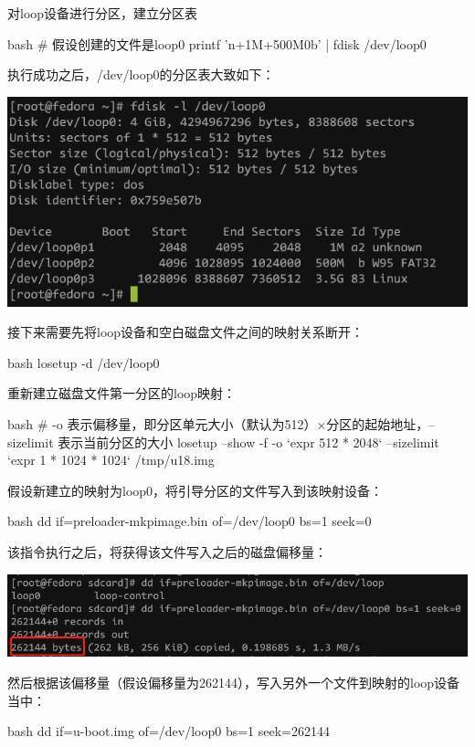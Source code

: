 \begin{outline}[enumerate]
对loop设备进行分区，建立分区表
\begin{code-block}{bash}
# 假设创建的文件是loop0
printf 'n\np{}\n\n+1M\nt{}\nn\np{}\n\n+500M\nt\n\n0b\nn\np\n\n\n\n\nwq\n' | fdisk /dev/loop0
\end{code-block}
执行成功之后，/dev/loop0的分区表大致如下：
\par\begin{minipage}{\linewidth}
  \centering
  \includegraphics[width=\linewidth]{loop_partition.png}
  \label{fig:loop_partition}
\end{minipage}

接下来需要先将loop设备和空白磁盘文件之间的映射关系断开：
\begin{code-block}{bash}
losetup -d /dev/loop0
\end{code-block}

重新建立磁盘文件第一分区的loop映射：
\begin{code-block}{bash}
# -o 表示偏移量，即分区单元大小（默认为512）×分区的起始地址，--sizelimit 表示当前分区的大小
losetup  --show -f -o `expr 512 * 2048` --sizelimit `expr 1 * 1024 * 1024` /tmp/u18.img
\end{code-block}

假设新建立的映射为loop0，将引导分区的文件写入到该映射设备：
\begin{code-block}{bash}
dd if=preloader-mkpimage.bin of=/dev/loop0 bs=1 seek=0
\end{code-block}
该指令执行之后，将获得该文件写入之后的磁盘偏移量：
\par\begin{minipage}{\linewidth}
  \centering
  \includegraphics[width=\linewidth]{loop_offset.png}
  \label{fig:loop_offset}
\end{minipage}
然后根据该偏移量（假设偏移量为262144），写入另外一个文件到映射的loop设备当中：
\begin{code-block}{bash}
dd if=u-boot.img of=/dev/loop0 bs=1 seek=262144
\end{code-block}


\end{outline}
